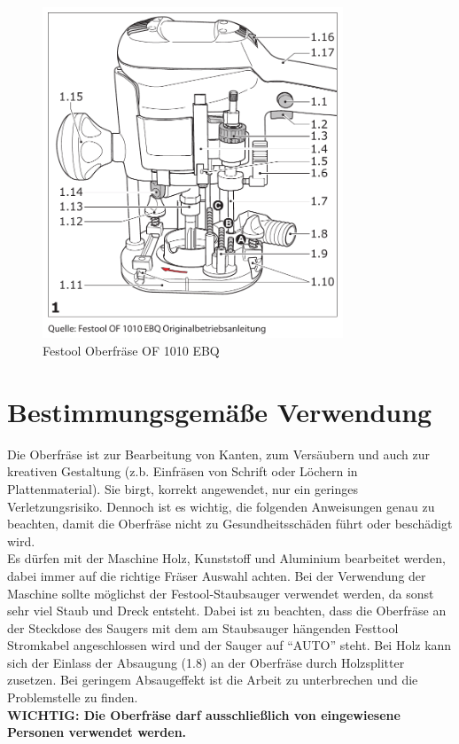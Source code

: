 \documentclass{\basedir/fablab-document}
\begin{document}
\begin{figure}[h!]
    \centering
    \includegraphics[width=0.8\textwidth]{bilder/oberfraese-sketch}
    \caption{Festool Oberfräse OF 1010 EBQ}
    \label{fig:sketch}
\end{figure}

\section{Bestimmungsgemäße Verwendung}
Die Oberfräse ist zur Bearbeitung von Kanten, zum Versäubern und auch zur kreativen Gestaltung (z.b. Einfräsen von Schrift oder Löchern in Plattenmaterial). Sie birgt, korrekt angewendet, nur ein geringes Verletzungsrisiko. Dennoch ist es wichtig, die folgenden Anweisungen genau zu beachten, damit die Oberfräse nicht zu Gesundheitsschäden führt oder beschädigt wird.\\
Es dürfen mit der Maschine Holz, Kunststoff und Aluminium bearbeitet werden, dabei immer auf die richtige Fräser Auswahl achten. Bei der Verwendung der Maschine sollte möglichst der Festool-Staubsauger verwendet werden, da sonst sehr viel Staub und Dreck entsteht. Dabei ist zu beachten, dass die Oberfräse an der Steckdose des Saugers mit dem am Staubsauger hängenden Festtool Stromkabel angeschlossen wird und der Sauger auf \enquote{AUTO} steht. Bei Holz kann sich der Einlass der Absaugung (1.8) an der Oberfräse durch Holzsplitter zusetzen. Bei geringem Absaugeffekt ist die Arbeit zu unterbrechen und die Problemstelle zu finden.\\
\textbf{WICHTIG: Die Oberfräse darf ausschließlich von eingewiesene Personen verwendet werden.}
\end{document}

